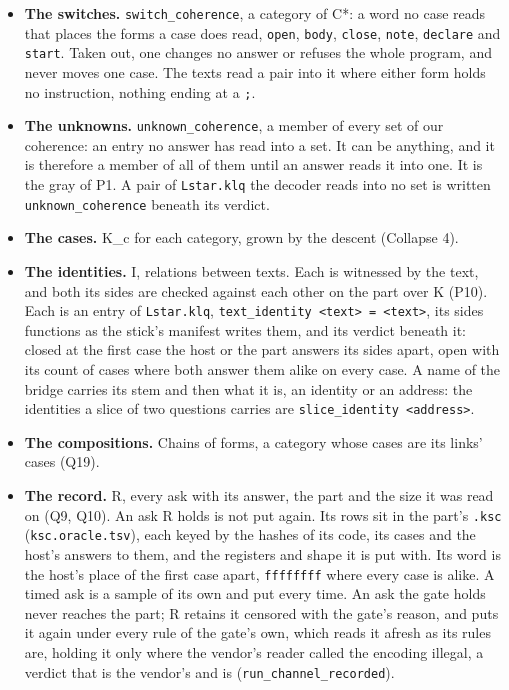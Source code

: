 \begin{itemize}
\item \textbf{The switches.} \texttt{switch\_\allowbreak{}coherence}, a category of C*: a word no case reads that places the forms a case does read, \texttt{open}, \texttt{body}, \texttt{close}, \texttt{note}, \texttt{declare} and \texttt{start}. Taken out, one changes no answer or refuses the whole program, and never moves one case. The texts read a pair into it where either form holds no instruction, nothing ending at a \texttt{;}.
\item \textbf{The unknowns.} \texttt{unknown\_\allowbreak{}coherence}, a member of every set of our coherence: an entry no answer has read into a set. It can be anything, and it is therefore a member of all of them until an answer reads it into one. It is the gray of P1. A pair of \texttt{Lstar.\allowbreak{}klq} the decoder reads into no set is written \texttt{unknown\_\allowbreak{}coherence} beneath its verdict.
\item \textbf{The cases.} K\_\allowbreak{}c for each category, grown by the descent (Collapse 4).
\item \textbf{The identities.} I, relations between texts. Each is witnessed by the text, and both its sides are checked against each other on the part over K (P10). Each is an entry of \texttt{Lstar.\allowbreak{}klq}, \texttt{text\_\allowbreak{}identity <text> = <text>}, its sides functions as the stick's manifest writes them, and its verdict beneath it: closed at the first case the host or the part answers its sides apart, open with its count of cases where both answer them alike on every case. A name of the bridge carries its stem and then what it is, an identity or an address: the identities a slice of two questions carries are \texttt{slice\_\allowbreak{}identity <address>}.
\item \textbf{The compositions.} Chains of forms, a category whose cases are its links' cases (Q19).
\item \textbf{The record.} R, every ask with its answer, the part and the size it was read on (Q9, Q10). An ask R holds is not put again. Its rows sit in the part's \texttt{.\allowbreak{}ksc} (\texttt{ksc.\allowbreak{}oracle.\allowbreak{}tsv}), each keyed by the hashes of its code, its cases and the host's answers to them, and the registers and shape it is put with. Its word is the host's place of the first case apart, \texttt{ffffffff} where every case is alike. A timed ask is a sample of its own and put every time. An ask the gate holds never reaches the part; R retains it censored with the gate's reason, and puts it again under every rule of the gate's own, which reads it afresh as its rules are, holding it only where the vendor's reader called the encoding illegal, a verdict that is the vendor's and is (\texttt{run\_\allowbreak{}channel\_\allowbreak{}recorded}).
\end{itemize}

